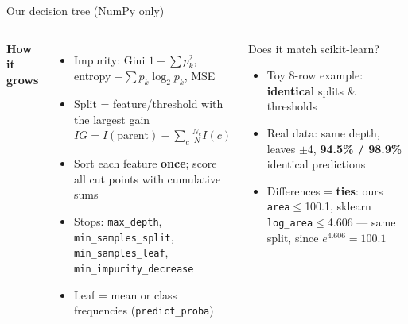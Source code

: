 \documentclass[aspectratio=169,11pt]{beamer}
\begin{document}
\begin{frame}{Our decision tree (NumPy only)}
  \begin{columns}[T,onlytextwidth]
  \textbf{How it grows}
  \begin{itemize}\setlength\itemsep{0.25em}
    \item Impurity: Gini $1-\sum p_k^2$, entropy $-\sum p_k\log_2 p_k$, MSE
    \item Split = feature/threshold with the largest gain\\
      $IG = I(\text{parent}) - \sum_c \frac{N_c}{N} I(c)$
    \item Sort each feature \textbf{once}; score all cut points with cumulative sums
    \item Stops: \texttt{max\_depth}, \texttt{min\_samples\_split},
          \texttt{min\_samples\_leaf}, \texttt{min\_impurity\_decrease}
    \item Leaf = mean or class frequencies (\texttt{predict\_proba})
  \end{itemize}

  \begin{block}{Does it match scikit-learn?}
    \begin{itemize}
      \item Toy 8-row example: \textbf{identical} splits \& thresholds
      \item Real data: same depth, leaves $\pm$4, \textbf{94.5\% / 98.9\%} identical predictions
      \item Differences = \textbf{ties}: ours \texttt{area}$\le$100.1, sklearn \texttt{log\_area}$\le$4.606 --- same split, since $e^{4.606}=100.1$
    \end{itemize}
  \end{block}
  \end{columns}
\end{frame}
\end{document}
